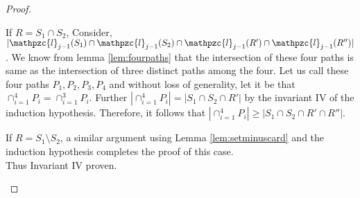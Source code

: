 \documentclass{fsttcs}
\def\cl{\mathpzc{l}}
\begin{document}
\begin{proof}
\begin{enumerate}
\begin{enumerate}
         If $R = S_1 \cap S_2$, Consider, $|\cl_{j-1}(S_1) \cap \cl_{j-1}(S_2) \cap \cl_{j-1}(R') \cap \cl_{j-1}(R'')|$. We know from lemma \ref{lem:fourpaths} that the intersection
of these four paths is same as the intersection of three distinct paths among the four.  
Let us call these four paths $P_1,P_2, P_3,P_4$ and without loss of generality, 
let it be that $\displaystyle \cap_{i=1}^4 P_i  = \cap_{i=1}^3 P_i$. Further $|\cap_{i=1}^4 P_i|=| S_1 \cap S_2 \cap R'|$ by the invariant IV of the induction hypothesis.  
Therefore, it follows that $|\cap_{i=1}^4 P_i| \geq |S_1 \cap S_2 \cap R' \cap R''|$.\\
\begin{comment}
 Next, we write $\displaystyle |\cap_{i=1}^4 P_i| = |P_4| + |\displaystyle \cap_{i=1}^3 P_i| - |P_4 \cup \cap_{i=1}^3 P_i|$. Clearly $\displaystyle P_4 \cup \cap_{i=1}^3 P_i = P_4$.  By
 induction hypothesis Invariant I and IV, We can now write 
$\displaystyle |\cap_{i=1}^4 P_i| = |S_4| + |\cap_{i=1}^3 S_i| - |S_4|$.  
Since $\cl_{j-1}$ is an ICPPL in which $S_4$ is mapped to
$P_4$, and $P_4$ contains $\displaystyle \cap_{i=1}^3 P_i$, it follows that 
$|S_4|=|P_4| \geq|\cap_{i=1}^3 P_i| = |S_1 \cap S_2 \cap R'| \geq |S_1 \cap S_2 \cap R' \cap R''|$.  
Therefore, $\displaystyle |\cap_{i=1}^4 P_i| \leq |S_1 \cap S_2 \cap R' \cap R''|$, 
and equality of these two terms follows because we have also proved the inequality in the
opposite direction. It now follows that$|\cl_j(R) \cap \cl_j(R') \cap \cl_j(R'')|=|\cl_{j-1}(S_1) \cap \cl_{j-1}(S_2) \cap \cl_{j-1}(R') \cap \cl_{j-1}(R'')| = |\cap_{i=1}^4 P_i| = |S_1 \cap S_2 \cap R' \cap R''|= |R \cap R' \cap R''|$. This completes induction hypothesis in this case. \\
\end{comment}
      If $R = S_1 \setminus S_2$, a similar argument using Lemma \ref{lem:setminuscard} and the induction hypothesis completes the proof of this case.\\
      Thus Invariant IV proven.
      \end{enumerate}
  \end{enumerate}
\end{proof}

\end{document}
